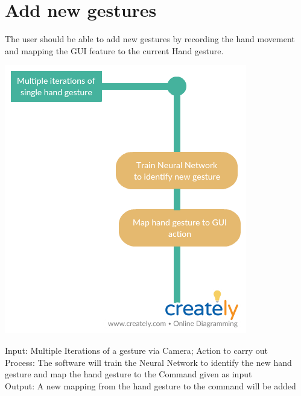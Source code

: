 \documentclass{scrreprt}
\begin{document}
\section{Add new gestures}
The user should be able to add new gestures by recording the hand movement and mapping the GUI feature to the current Hand gesture.
\begin{center}
    \includegraphics[scale=0.5]{add.png}
\end{center}
Input: Multiple Iterations of a gesture via Camera; Action to carry out
\\Process: The software will train the Neural Network to identify the new hand gesture and map the hand gesture to the Command given as input
\\Output: A new mapping from the hand gesture to the command will be added

\newpage
\end{document}
